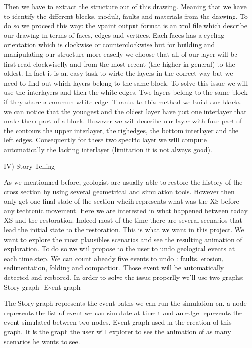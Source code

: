 \documentclass[12pt, a4paper]{memoir} %
\begin{document}
Then we have to extract the structure out of this drawing. Meaning that we have to identify the different blocks, moduli, faults and materials from the drawing. To do so we proceed this way: the vpaint output format is an xml file which describe our drawing in terms
of faces, edges and vertices. Each faces has a cycling orientation which is clockwise or counterclockwise but for building and manipulating our structure more easelly we choose that all of our layer will be first read clockwiselly and from the most recent (the higher in general) to the oldest. In fact it is an easy task to wirte the layers in the correct way but we need to find out which layers belong to the same block. To solve this issue we will use the interlayers and then the white edges. Two layers belong to the same block if they share a commun white edge. Thanks to this method we build our blocks. we can notice that the youngest and the oldest layer have just one interlayer that make them part of a block. However we will describe our layer with four part of the contours the upper interlayer, the righedges, the bottom interlayer and the left edges. Consequently for these two specific layer we will compute automatically the lacking interlayer (limitation it is not always good).
	

IV) Story Telling

As we mentionned before, geologist are usually able to restore the history of the cross section by using several geometrical and simulation tools.
However then only get one final state of the section whcih represents what was the XS before any techtonic movement. Here we are interested in what 
happened between today XS and the restoration. Indeed most of the time there are several scenarios that lead the initial state to the restoration.
This is what we want in this project. We want to explore the most plausibles scenarios and see the resulting animation of exploration.
To do so we wiil propose to the user to undo geological events at each time step. We can count already five events to undo : faults, erosion, sedimentation, folding and compaction. Those event will be automatically detected and resbored. In order to solve the issue properlly we'll use two graphs:
	-Story graph
	-Event graph

The Story graph represents the event paths we can run the simulation on. a node represents the list of event we can simulate at time t and an edge represents the event simulated between two nodes. Event graph used in the creation of this graph. It is the graph the user will explorer to see the animation of as many scenarios he wants to see.
\end{document}
